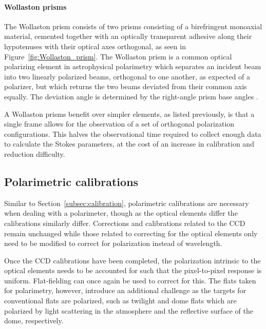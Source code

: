 \paragraph{Wollaston prisms}
The Wollaston prism consists of two prisms consisting of a birefringent monoaxial material, cemented together with an optically transparent adhesive along their hypotenuses with their optical axes orthogonal, as seen in Figure~\ref{fig:Wollaston_prism}. The Wollaston prism is a common optical polarizing element in astrophysical polarimetry which separates an incident beam into two linearly polarized beams, orthogonal to one another, as expected of a polarizer, but which returns the two beams deviated from their common axis equally. The deviation angle is determined by the right-angle prism base angles \citep{wollaston}.
\prgph

A Wollaston prisms benefit over simpler elements, as listed previously, is that a single frame allows for the observation of a set of orthogonal polarization configurations. This halves the observational time required to collect enough data to calculate the Stokes parameters, at the cost of an increase in calibration and reduction difficulty.

\subsection{Polarimetric calibrations}\label{subsec:pol_cal}

Similar to Section~\ref{subsec:calibration}, polarimetric calibrations are necessary when dealing with a polarimeter, though as the optical elements differ the calibrations similarly differ. Corrections and calibrations related to the \gls{CCD} remain unchanged while those related to correcting for the optical elements only need to be modified to correct for polarization instead of wavelength.
\prgph

Once the \gls{CCD} calibrations have been completed, the polarization intrinsic to the optical elements needs to be accounted for such that the pixel-to-pixel response is uniform. Flat-fielding can once again be used to correct for this. The flats taken for polarimetry, however, introduce an additional challenge as the targets for conventional flats are polarized, such as twilight and dome flats which are polarized by light scattering in the atmosphere and the reflective surface of the dome, respectively.
\prgph

